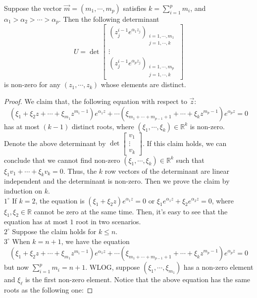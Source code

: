 \begin{lemma}{\label{NonVanish}}
	Suppose the vector $\vec{m}=(m_1,\cdots,m_p)$ satisfies $k=\sum_{i=1}^{p}m_{i}$, and $\alpha_1>\alpha_2>\cdots>\alpha_p$. Then the following determinant
\[ U= \det
	\left[ \begin{array}{ccc}
		(z_{j}^{i-1}e^{\alpha_{1}z_{j}})_{\substack{i=1,\cdots,m_{1}\\j=1,\cdots,k}}\\
	\vdots\\
	(z_{j}^{i-1}e^{\alpha_{p}z_{j}})_{\substack{i=1,\cdots,m_{p}\\j=1,\cdots,k}}
	\end{array}
	\right]
\]
is non-zero for any $(z_{1},\cdots,z_{k})$ whose elements are distinct.
\end{lemma}

\begin{proof} We claim that, the following equation with respect to $\vec{z}$:
$$(\xi_{1}+\xi_{2}z+\cdots+\xi_{m_1}z^{m_{i}-1})e^{\alpha_{1}z}+\cdots(\xi_{m_{1}+\cdots+m_{p-1}+1}+\cdots+\xi_{k}z^{m_{p}-1})e^{\alpha_{p}z}=0$$ has at most $(k-1)$ distinct roots, where $(\xi_{1},\cdots,\xi_{k})\in\mathbb{R}^{k}$ is non-zero.\\
Denote the above determinant by $\det\left[\begin{smallmatrix} v_{1}\\\vdots\\ v_{k} \end{smallmatrix}\right]$. If this claim holds, we can conclude that we cannot find non-zero $(\xi_{1},\cdots,\xi_{k})\in\mathbb{R}^{k}$ such that $\xi_{1}v_{1}+\cdots+\xi_{k}v_{k}=0$. Thus, the $k$ row vectors of the determinant are linear independent and the determinant is non-zero. Then we prove the claim by induction on $k$.\\
$1^{\circ}$ If $k=2$, the equation is $(\xi_{1}+\xi_{2}z)e^{\alpha_{1}z}=0$ or $\xi_{1}e^{\alpha_{1}z}+\xi_{2}e^{\alpha_{2}z}=0$, where $\xi_{1},\xi_{2}\in\mathbb{R}$ cannot be zero at the same time. Then, it's easy to see that the equation has at most $1$ root in two scenarios.\\
$2^{\circ}$ Suppose the claim holds for $k\leq n$.\\
$3^{\circ}$ When $k=n+1$, we have the equation $$(\xi_{1}+\xi_{2}z+\cdots+\xi_{m_1}z^{m_{i}-1})e^{\alpha_{1}z}+\cdots(\xi_{m_{1}+\cdots+m_{p-1}+1}+\cdots+\xi_{k}z^{m_{p}-1})e^{\alpha_{p}z}=0$$ but now $\sum_{i=1}^{p}m_{i}=n+1$. WLOG, suppose $(\xi_{1},\cdots,\xi_{m_{1}})$ has a non-zero element and $\xi_{\ell}$ is the first non-zero element. Notice that the above equation has the same roots as the following one:

\end{proof}
